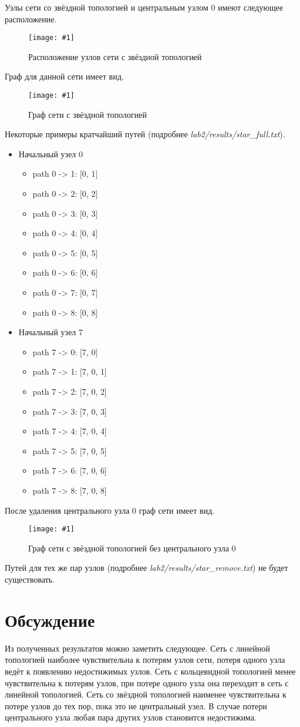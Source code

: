 \documentclass[a4paper,12pt]{article}
\newcommand{\plot}[3]{
    \begin{figure}[H]
        \begin{center}
            \texttt{[image: \#1]}
            \caption{#2}
            \label{#3}
        \end{center}
    \end{figure}
}
\begin{document}
    Узлы сети со звёздной топологией и центральным узлом $ 0 $ имеют следующее расположение.
    \plot{full_star_points}{Расположение узлов сети с звёздной топологией}{p:fullStarPoints}

    Граф для данной сети имеет вид.
    \plot{full_star}{Граф сети с звёздной топологией}{p:fullStar}

    Некоторые примеры кратчайший путей (подробнее \textsl{lab2/results/star\_full.txt}).
    \begin{itemize}
        \item Начальный узел $ 0 $
        \begin{itemize}
            \item path 0 -> 1: [0, 1]
            \item path 0 -> 2: [0, 2]
            \item path 0 -> 3: [0, 3]
            \item path 0 -> 4: [0, 4]
            \item path 0 -> 5: [0, 5]
            \item path 0 -> 6: [0, 6]
            \item path 0 -> 7: [0, 7]
            \item path 0 -> 8: [0, 8]
        \end{itemize}
        \item Начальный узел $ 7 $
        \begin{itemize}
            \item path 7 -> 0: [7, 0]
            \item path 7 -> 1: [7, 0, 1]
            \item path 7 -> 2: [7, 0, 2]
            \item path 7 -> 3: [7, 0, 3]
            \item path 7 -> 4: [7, 0, 4]
            \item path 7 -> 5: [7, 0, 5]
            \item path 7 -> 6: [7, 0, 6]
            \item path 7 -> 8: [7, 0, 8]
        \end{itemize}
    \end{itemize}

    После удаления центрального узла $ 0 $ граф сети имеет вид.
    \plot{rm_star}{Граф сети с звёздной топологией без центрального узла $ 0 $}{p:rmStar}

    Путей для тех же пар узлов (подробнее \textsl{lab2/results/star\_remove.txt})
    не будет существовать.

    \section{Обсуждение}
    Из полученных результатов можно заметить следующее.
    Сеть с линейной топологией наиболее чувствительна к потерям
    узлов сети, потеря одного узла ведёт к появлению недостижимых узлов.
    Сеть с кольцевидной топологией менее чувствительна к потерям узлов,
    при потере одного узла она переходит в сеть с линейной топологией.
    Сеть со звёздной топологией наименее чувствительна к потере узлов до тех пор,
    пока это не центральный узел.
    В случае потери центрального узла любая пара других узлов становится недостижима. 
\end{document}
